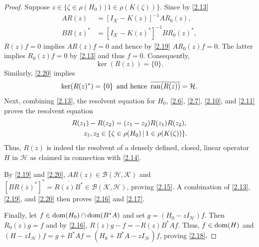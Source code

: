 \documentclass[reqno,10pt, centertags]{amsart}
\newcommand{\cB}{{\mathcal B}}
\newcommand{\cH}{{\mathcal H}}
\newcommand{\cK}{{\mathcal K}}
\newcommand{\lb}{\label}
\newcommand{\ol}{\overline}
\newcommand{\ran}{\text{\rm{ran}}}
\newcommand{\dom}{\text{\rm{dom}}}
\numberwithin{equation}{section}
\theoremstyle{definition}
\begin{document}
\begin{proof}
Suppose $z\in\{\zeta\in\rho(H_0)\,|\, 1\in\rho(K(\zeta))\}$. Since
by \eqref{2.13}
\begin{align}
AR(z)&=[I_{\cK}-K(z)]^{-1}AR_0(z), \lb{2.19} \\
BR(z)^*&=[I_{\cK}-K(z)^*]^{-1}BR_0(z)^*, \lb{2.20}
\end{align}
$R(z)f=0$ implies $AR(z)f=0$ and hence by \eqref{2.19} $AR_0(z)f=0$.
The latter implies $R_0(z)f=0$ by \eqref{2.13} and thus $f=0$.
Consequently,
\begin{equation}
\ker(R(z))=\{0\}. \lb{2.21}
\end{equation}
Similarly, \eqref{2.20} implies
\begin{equation}
\ker(R(z)^*)=\{0\} \, \text{ and hence } \, \ol{\ran(R(z))}=\cH.
\lb{2.22}
\end{equation}
Next, combining \eqref{2.13}, the resolvent equation for $H_0$,
\eqref{2.6}, \eqref{2.7}, \eqref{2.10}, and \eqref{2.11} proves the
resolvent equation
\begin{align}
\begin{split}
& R(z_1)-R(z_2)=(z_1-z_2)R(z_1)R(z_2), \lb{2.23} \\
& \hspace*{.6cm}
z_1, z_2 \in\{\zeta\in\rho(H_0)\,|\, 1\in\rho(K(\zeta))\}.
\end{split}
\end{align}
Thus, $R(z)$ is indeed the resolvent of a densely defined, closed,
linear operator $H$ in $\cH$ as claimed in connection with \eqref{2.14}.

By \eqref{2.19} and \eqref{2.20}, $AR(z)\in\cB(\cH,\cK)$ and
$[BR(\ol z)^*]^*=\ol{R(z)B^*}\in\cB(\cK,\cH)$, proving \eqref{2.15}. A
combination of \eqref{2.13}, \eqref{2.19}, and \eqref{2.20} then
proves \eqref{2.16} and \eqref{2.17}.

Finally, let $f\in\dom(H_0)\cap\dom(B^*A)$ and set $g=(H_0-z I_{\cH})f$.
Then $R_0(z)g=f$ and by \eqref{2.16}, $R(z)g-f=-R(z)B^*Af$.
Thus, $f\in\dom(H)$ and $(H-zI_{\cH})f=g+B^*Af
=(H_0+B^*A-zI_{\cH})f$, proving \eqref{2.18}.
\end{proof}
\end{document}
